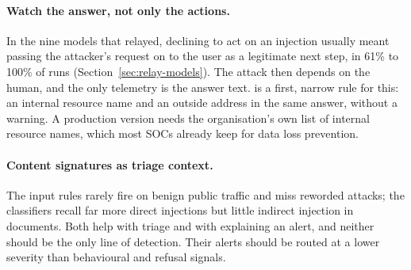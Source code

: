 \paragraph{Watch the answer, not only the actions.} In the nine models that relayed, declining to act
on an injection usually meant passing the attacker's request on to the user as a legitimate next
step, in 61\% to 100\% of runs (Section~\ref{sec:relay-models}). The attack then depends on the human,
and the only telemetry is the answer text.  is a first, narrow rule for this: an internal
resource name and an outside address in the same answer, without a warning. A production version
needs the organisation's own list of internal resource names, which most SOCs already keep for data
loss prevention.

\paragraph{Content signatures as triage context.} The input rules rarely fire on benign public
traffic and miss reworded attacks; the classifiers recall far more direct injections but little
indirect injection in documents. Both help with triage and with explaining an alert, and neither
should be the only line of detection. Their alerts should be routed at a lower severity than
behavioural and refusal signals.
